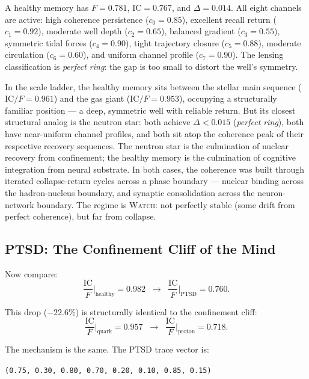 \documentclass[
  aps,
  prd,
  twocolumn,
  superscriptaddress,
  nofootinbib,
  floatfix
]{revtex4-2}
\newcommand{\beq}{\begin{equation}}
\newcommand{\eeq}{\end{equation}}
\newcommand{\regime}[1]{\textrm{\upshape\scshape#1}}
\newcommand{\IC}{\mathrm{IC}}
\begin{document}
A healthy memory has $F = 0.781$, $\IC = 0.767$, and
$\Delta = 0.014$.  All eight channels are active: high
coherence persistence ($c_0 = 0.85$), excellent recall return
($c_1 = 0.92$), moderate well depth ($c_2 = 0.65$), balanced
gradient ($c_3 = 0.55$), symmetric tidal forces
($c_4 = 0.90$), tight trajectory closure ($c_5 = 0.88$),
moderate circulation ($c_6 = 0.60$), and uniform channel
profile ($c_7 = 0.90$).  The lensing classification is
\emph{perfect ring}: the gap is too small to distort the
well's symmetry.

In the scale ladder, the healthy memory sits between the
stellar main sequence ($\IC/F = 0.961$) and the gas giant
($\IC/F = 0.953$), occupying a structurally familiar
position --- a deep, symmetric well with reliable return.
But its closest structural analog is the neutron star:
both achieve $\Delta < 0.015$ (\emph{perfect ring}), both
have near-uniform channel profiles, and both sit atop the
coherence peak of their respective recovery sequences.
The neutron star is the culmination of nuclear recovery
from confinement; the healthy memory is the culmination of
cognitive integration from neural substrate.  In both cases,
the coherence was built through iterated collapse-return
cycles across a phase boundary --- nuclear binding across
the hadron-nucleus boundary, and synaptic consolidation
across the neuron-network boundary.
The regime is \regime{Watch}: not perfectly stable (some
drift from perfect coherence), but far from collapse.


\subsection{PTSD: The Confinement Cliff of the Mind}

Now compare:
\beq\label{eq:ptsd_cliff}
  \frac{\IC}{F}\bigg|_{\text{healthy}} = 0.982
  \;\;\longrightarrow\;\;
  \frac{\IC}{F}\bigg|_{\text{PTSD}} = 0.760.
\eeq

This drop ($-22.6\%$) is structurally identical to the
confinement cliff:
\beq\label{eq:quark_cliff}
  \frac{\IC}{F}\bigg|_{\text{quark}} = 0.957
  \;\;\longrightarrow\;\;
  \frac{\IC}{F}\bigg|_{\text{proton}} = 0.718.
\eeq

The mechanism is the same.  The PTSD trace vector is:
\begin{center}
\texttt{(0.75, 0.30, 0.80, 0.70, 0.20, 0.10, 0.85, 0.15)}
\end{center}
\end{document}
